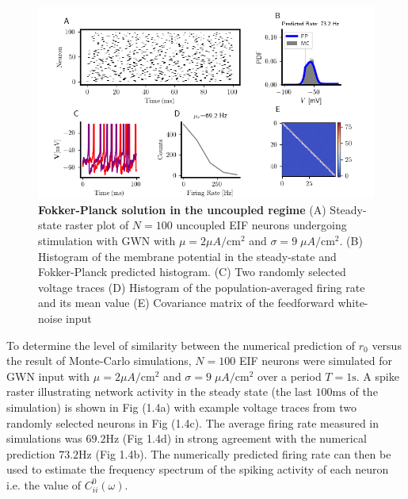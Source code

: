 \documentclass{ucetd}
\begin{document}
\begin{figure}[t!]
\centering
\includegraphics[width=175mm]{figure-3}
\caption{\textbf{Fokker-Planck solution in the uncoupled regime} (A) Steady-state raster plot of $N=100$ uncoupled EIF neurons undergoing stimulation with GWN with $\mu = 2\mu A/\mathrm{cm}^{2}$ and $\sigma = 9 \;\mu A/\mathrm{cm}^{2}$. (B) Histogram of the membrane potential in the steady-state and Fokker-Planck predicted histogram. (C) Two randomly selected voltage traces (D) Histogram of the population-averaged firing rate and its mean value (E) Covariance matrix of the feedforward white-noise input}
\end{figure}

To determine the level of similarity between the numerical prediction of $r_{0}$ versus the result of Monte-Carlo simulations, $N=100$ EIF neurons were simulated for GWN input with $\mu = 2\mu A/\mathrm{cm}^{2}$ and $\sigma = 9 \;\mu A/\mathrm{cm}^{2}$ over a period $T = 1\mathrm{s}$. A spike raster illustrating network activity in the steady state (the last $100\mathrm{ms}$ of the simulation) is shown in Fig (1.4a) with example voltage traces from two randomly selected neurons in Fig (1.4c). The average firing rate measured in simulations was $69.2\mathrm{Hz}$ (Fig 1.4d) in strong agreement with the numerical prediction $73.2\mathrm{Hz}$ (Fig 1.4b). The numerically predicted firing rate can then be used to estimate the frequency spectrum of the spiking activity of each neuron i.e. the value of $C_{ii}^{0}(\omega)$. 
\end{document}
